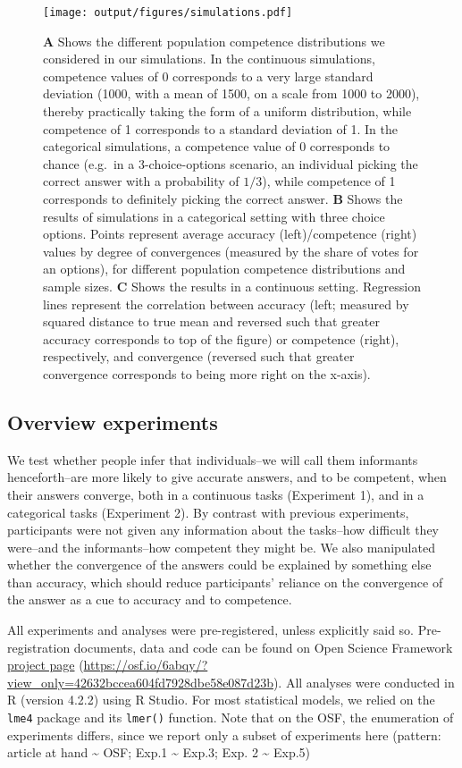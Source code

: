 \documentclass[
  doc,floatsintext]{apa6}
\begin{document}
\begin{figure}
\centering
\texttt{[image: output/figures/simulations.pdf]}
\caption{\label{fig:simulations}\textbf{A} Shows the different population competence distributions we considered in our simulations. In the continuous simulations, competence values of 0 corresponds to a very large standard deviation (1000, with a mean of 1500, on a scale from 1000 to 2000), thereby practically taking the form of a uniform distribution, while competence of 1 corresponds to a standard deviation of 1. In the categorical simulations, a competence value of 0 corresponds to chance (e.g.~in a 3-choice-options scenario, an individual picking the correct answer with a probability of \(1/3\)), while competence of 1 corresponds to definitely picking the correct answer. \textbf{B} Shows the results of simulations in a categorical setting with three choice options. Points represent average accuracy (left)/competence (right) values by degree of convergences (measured by the share of votes for an options), for different population competence distributions and sample sizes. \textbf{C} Shows the results in a continuous setting. Regression lines represent the correlation between accuracy (left; measured by squared distance to true mean and reversed such that greater accuracy corresponds to top of the figure) or competence (right), respectively, and convergence (reversed such that greater convergence corresponds to being more right on the x-axis).}
\end{figure}

\hypertarget{overview-experiments}{%
\subsection{Overview experiments}\label{overview-experiments}}

We test whether people infer that individuals--we will call them informants henceforth--are more likely to give accurate answers, and to be competent, when their answers converge, both in a continuous tasks (Experiment 1), and in a categorical tasks (Experiment 2). By contrast with previous experiments, participants were not given any information about the tasks--how difficult they were--and the informants--how competent they might be. We also manipulated whether the convergence of the answers could be explained by something else than accuracy, which should reduce participants' reliance on the convergence of the answer as a cue to accuracy and to competence.

All experiments and analyses were pre-registered, unless explicitly said so. Pre-registration documents, data and code can be found on Open Science Framework \href{https://osf.io/6abqy/?view_only=42632bccea604fd7928dbe58e087d23b}{project page} (\url{https://osf.io/6abqy/?view_only=42632bccea604fd7928dbe58e087d23b}). All analyses were conducted in R (version 4.2.2) using R Studio. For most statistical models, we relied on the \texttt{lme4} package and its \texttt{lmer()} function. Note that on the OSF, the enumeration of experiments differs, since we report only a subset of experiments here (pattern: article at hand \textasciitilde{} OSF; Exp.1 \textasciitilde{} Exp.3; Exp. 2 \textasciitilde{} Exp.5)
\end{document}
